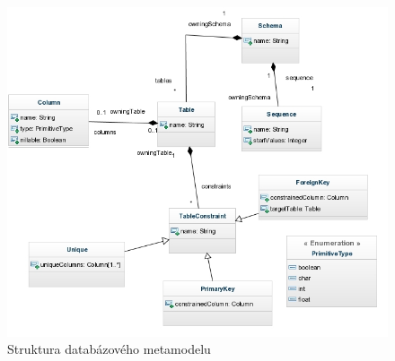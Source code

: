 \documentclass[11pt,twoside,a4paper]{book}
\begin{document}
\begin{figure}[H]
\begin{center}
\includegraphics[width=15cm]{figures/rdb_structure}
\caption{Struktura databázového metamodelu}
\label{fig:rdb_str}
\end{center}
\end{figure}
%
\FloatBarrier



\end{document}
